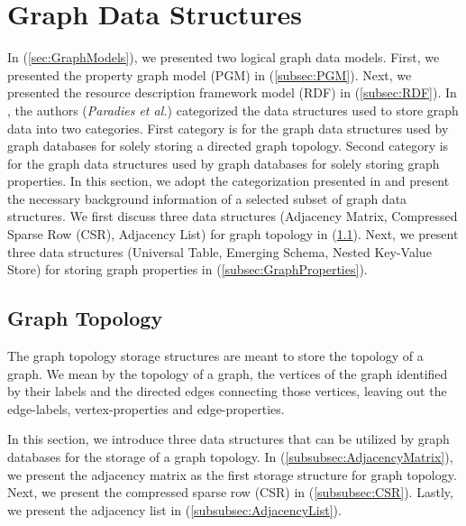 {\section{Graph Data Structures}
\label{sec:StorageStructures}

In (\ref{sec:GraphModels}), we presented two logical graph data models. First, we presented the property graph model (PGM) in (\ref{subsec:PGM}). Next, we presented the resource description framework model (RDF) in (\ref{subsec:RDF}). In \cite{Paradies2017},  the authors (\textit{Paradies et al.}) categorized the data structures used to store graph data into two categories. First category is for the graph data structures used by graph databases for solely storing a directed graph topology. Second category is for the graph data structures used by graph databases for solely storing graph properties. In this section, we adopt the categorization presented in \cite{Paradies2017} and present the necessary background information of a selected subset of graph data structures. We first discuss three data structures (Adjacency Matrix, Compressed Sparse Row (CSR), Adjacency List) for graph topology in (\ref{subsec:GraphTopology}). Next, we present three data structures (Universal Table, Emerging Schema, Nested Key-Value Store) for storing graph properties in (\ref{subsec:GraphProperties}).


\subsection{Graph Topology}
\label{subsec:GraphTopology}

The graph topology storage structures are meant to store the topology of a graph. We mean by the topology of a graph, the vertices of the graph identified by their labels and the directed edges connecting those vertices, leaving out the edge-labels, vertex-properties and edge-properties.

In this section, we introduce three data structures that can be utilized by graph databases for the storage of a graph topology. In (\ref{subsubsec:AdjacencyMatrix}), we present the adjacency matrix as the first storage structure for graph topology. Next, we present the compressed sparse row (CSR) in (\ref{subsubsec:CSR}). Lastly, we present the adjacency list in (\ref{subsubsec:AdjacencyList}).


}
